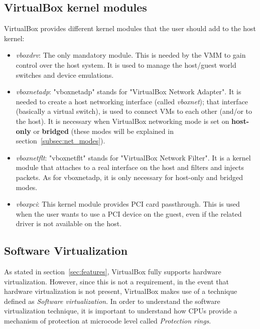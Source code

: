 \documentclass[a4paper, 12pt, titlepage]{report}
\begin{document}
\subsection{VirtualBox kernel modules}
VirtualBox provides different kernel modules that the user should add to the host kernel:
\begin{itemize}
\item \textit{vboxdrv}: The only mandatory module. This is needed by the VMM to gain control over the host system. It is used to manage the host/guest world switches and device emulations.
\item \textit{vboxnetadp}: "vboxnetadp" stands for "VirtualBox Network Adapter". It is needed to create a host networking interface (called \textit{vboxnet}); that interface (basically a virtual switch), is used to connect VMs to each other (and/or to the host). It is necessary when VirtualBox networking mode is set on \textbf{host-only} or \textbf{bridged} (these modes will be explained in section~\ref{subsec:net_modes}).
\item \textit{vboxnetflt}: "vboxnetflt" stands for "VirtualBox Network Filter". It is a kernel module that attaches to a real interface on the host and filters and injects packets. As for vboxnetadp, it is only necessary for host-only and bridged modes.
\item \textit{vboxpci}: This kernel module provides PCI card passthrough. This is used when the user wants to use a PCI device on the guest, even if the related driver is not available on the host.
\end{itemize}
\subsection{Software Virtualization}
As stated in section~\ref{sec:features}, VirtualBox fully supports hardware virtualization. However, since this is not a requirement, in the event that hardware virtualization is not present, VirtualBox makes use of a technique defined as \textit{Software virtualization}.
In order to understand the software virtualization technique, it is important to understand how CPUs provide a mechanism of protection at microcode level called \textit{Protection rings}.
\end{document}
